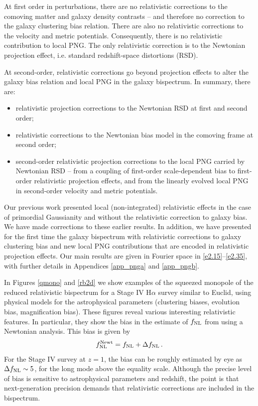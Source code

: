 {{{At first order in perturbations, there are no relativistic corrections to the comoving matter and galaxy density contrasts -- and therefore no correction to the galaxy clustering bias relation.  There are also no relativistic corrections to the velocity and metric potentials.  Consequently, there is no relativistic contribution to local PNG. The only relativistic correction is to the Newtonian projection effect, i.e. standard redshift-space distortions (RSD). 

At second-order, relativistic corrections go beyond projection effects to alter the galaxy bias relation and local PNG in the galaxy bispectrum. In summary, there are: 
\begin{itemize}
\item
relativistic projection corrections to the Newtonian RSD at first and second order;
\item
relativistic corrections to the Newtonian bias model in the comoving frame at second order;
\item
 second-order relativistic projection  corrections to the local PNG carried by Newtonian RSD -- from a coupling of first-order scale-dependent bias to first-order relativistic projection effects,  and from the linearly evolved local PNG in second-order velocity and metric potentials. 
 \end{itemize}

Our previous work \cite{Umeh:2016nuh,Jolicoeur:2017nyt, Jolicoeur:2017eyi, Jolicoeur:2018blf,Clarkson:2018dwn,Maartens:2019yhx,deWeerd:2019cae, Jolicoeur:2020eup} presented local (non-integrated) relativistic effects in the case of primordial Gaussianity and without the relativistic correction to galaxy bias. We have made corrections to these earlier results. In addition,  we have presented for the first time the galaxy bispectrum with relativistic corrections to galaxy clustering bias and new local PNG contributions that are encoded in relativistic projection effects.
Our main results are given  in Fourier space in \eqref{e2.15}--\eqref{e2.35}, with further details in Appendices \ref{app_pnga} and \ref{app_pngb}.

In Figures \ref{qmono} and \ref{rb2d}  we show examples of the squeezed monopole of the  reduced relativistic bispectrum for a Stage IV H$\alpha$ survey similar to Euclid, using physical models for the astrophysical parameters (clustering biases, evolution bias, magnification bias). These figures reveal various interesting relativistic features. In particular, they show  the bias in the estimate of $f_\text{NL}$ from using a Newtonian analysis. This bias is given by
\begin{equation}
f_\text{NL}^{\mathrm{Newt}} = f_\text{NL} + \Delta f_\text{NL}\,.
\end{equation}
For the Stage IV survey at $z=1$, the bias can be roughly estimated by eye as $\Delta f_\text{NL}\sim 5$, for the long mode above the equality scale. Although the precise level of bias is sensitive to astrophysical parameters and redshift, the point is that next-generation precision demands that relativistic corrections are included in the bispectrum.

}}}
